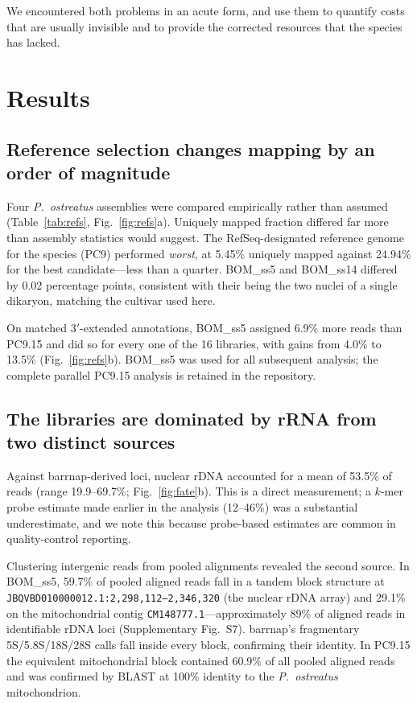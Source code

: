 We encountered both problems in an acute form, and use them to quantify costs that are
usually invisible and to provide the corrected resources that the species has lacked.

\section{Results}

\subsection{Reference selection changes mapping by an order of magnitude}\label{sec:refs}

Four \textit{P.\ ostreatus} assemblies were compared empirically rather than assumed
(Table~\ref{tab:refs}, Fig.~\ref{fig:refs}a). Uniquely mapped fraction differed far more than
assembly statistics would suggest. The RefSeq-designated reference genome for the species
(PC9) performed \emph{worst}, at 5.45\% uniquely mapped against 24.94\% for the best
candidate---less than a quarter. BOM\_ss5 and BOM\_ss14 differed by 0.02 percentage points,
consistent with their being the two nuclei of a single dikaryon, matching the cultivar used
here.

On matched 3$'$-extended annotations, BOM\_ss5 assigned 6.9\% more reads than PC9.15 and did
so for every one of the 16 libraries, with gains from 4.0\% to 13.5\%
(Fig.~\ref{fig:refs}b). BOM\_ss5 was used for all subsequent analysis; the complete parallel
PC9.15 analysis is retained in the repository.

\subsection{The libraries are dominated by rRNA from two distinct sources}\label{sec:rrna}

Against barrnap-derived loci, nuclear rDNA accounted for a mean of 53.5\% of reads
(range 19.9--69.7\%; Fig.~\ref{fig:fate}b). This is a direct measurement; a $k$-mer probe
estimate made earlier in the analysis (12--46\%) was a substantial underestimate, and we note
this because probe-based estimates are common in quality-control reporting.

Clustering intergenic reads from pooled alignments revealed the second source. In BOM\_ss5,
59.7\% of pooled aligned reads fall in a tandem block structure at
\texttt{JBQVBD010000012.1:2{,}298{,}112--2{,}346{,}320} (the nuclear rDNA array) and 29.1\% on
the mitochondrial contig \texttt{CM148777.1}---approximately 89\% of aligned reads in
identifiable rDNA loci (Supplementary Fig.~S7). barrnap's fragmentary 5S/5.8S/18S/28S calls
fall inside every block, confirming their identity. In PC9.15 the equivalent mitochondrial
block contained 60.9\% of all pooled aligned reads and was confirmed by BLAST at 100\%
identity to the \textit{P.\ ostreatus} mitochondrion.

